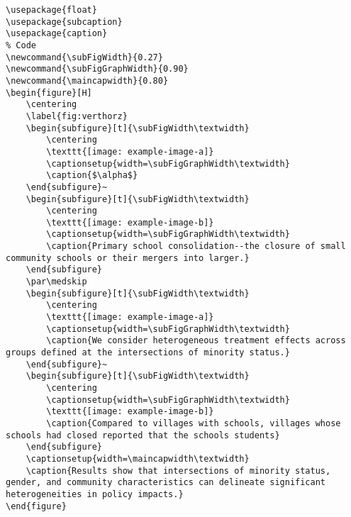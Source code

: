 \documentclass[12pt,english]{article}
\begin{document}
\begin{lstlisting}[frame=single]
% Included Package
\usepackage{float}
\usepackage{subcaption}
\usepackage{caption}
% Code
\newcommand{\subFigWidth}{0.27}
\newcommand{\subFigGraphWidth}{0.90}
\newcommand{\maincapwidth}{0.80}
\begin{figure}[H]
    \centering
	\label{fig:verthorz}
    \begin{subfigure}[t]{\subFigWidth\textwidth}
        \centering
        \texttt{[image: example-image-a]}
        \captionsetup{width=\subFigGraphWidth\textwidth}
        \caption{$\alpha$}
    \end{subfigure}~
	\begin{subfigure}[t]{\subFigWidth\textwidth}
	    \centering
    	\texttt{[image: example-image-b]}
    	\captionsetup{width=\subFigGraphWidth\textwidth}
    	\caption{Primary school consolidation--the closure of small community schools or their mergers into larger.}
	\end{subfigure}
	\par\medskip
	\begin{subfigure}[t]{\subFigWidth\textwidth}
        \centering
        \texttt{[image: example-image-a]}
        \captionsetup{width=\subFigGraphWidth\textwidth}
        \caption{We consider heterogeneous treatment effects across groups defined at the intersections of minority status.}
    \end{subfigure}~
	\begin{subfigure}[t]{\subFigWidth\textwidth}
	    \centering
	    \captionsetup{width=\subFigGraphWidth\textwidth}
    	\texttt{[image: example-image-b]}
    	\caption{Compared to villages with schools, villages whose schools had closed reported that the schools students}
	\end{subfigure}
	\captionsetup{width=\maincapwidth\textwidth}
	\caption{Results show that intersections of minority status, gender, and community characteristics can delineate significant heterogeneities in policy impacts.}
\end{figure}
\end{lstlisting}
\end{document}
